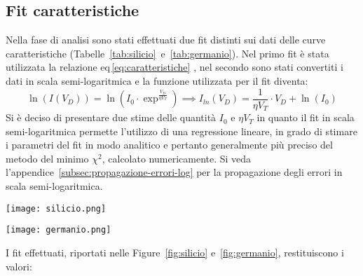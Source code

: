 \documentclass[@SRC@/main]{subfiles}
\begin{document}
  \subsection{Fit caratteristiche}
    Nella fase di analisi sono stati effettuati due fit distinti sui dati delle curve
    caratteristiche (Tabelle~\ref{tab:silicio}~e~\ref{tab:germanio}).
    Nel primo fit è stata utilizzata la relazione eq\,\eqref{eq:caratteristiche}
    , nel secondo sono stati convertiti i dati in
    scala semi-logaritmica e la funzione utilizzata per il fit diventa:
    \vspace{2pt}
    \begin{equation*}
      \ln  (I(V_D)) = \ln \left( I_0 \cdot \exp^{\frac{V_D}{\eta V_T}} \right) \implies
      I_{ln}(V_D) = \frac{1}{\eta V_T} \cdot V_D + \ln (I_0)
    \end{equation*}
    \vspace{3pt}
    \newline
    \noindent Si è deciso di presentare due stime delle quantità $I_{0}$ e $\eta V_{T}$
    in quanto il fit in scala semi-logaritmica
    permette l'utilizzo di una regressione lineare, in grado di stimare i parametri del fit in modo analitico e
    pertanto
    generalmente più preciso del metodo del minimo $\chi^2$, calcolato numericamente.
    Si veda l'appendice~\ref{subsec:propagazione-errori-log} per la propagazione degli
    errori in scala semi-logaritmica.
    \vspace{4pt}
    \newline
    \begin{center}
      \begin{minipage}{.95\textwidth}
        \centering
        \texttt{[image: silicio.png]}
        \label{fig:silicio}
      \end{minipage}
    \end{center}
    \vspace{0.5pt}
    \begin{center}
      \begin{minipage}[t]{.95\textwidth}
        \centering
        \texttt{[image: germanio.png]}
        \label{fig:germanio}
      \end{minipage}
    \end{center}
    \vspace{0.5pt}
    \noindent I fit effettuati, riportati nelle Figure~\ref{fig:silicio} e~\ref{fig:germanio}, restituiscono i valori:
\end{document}
